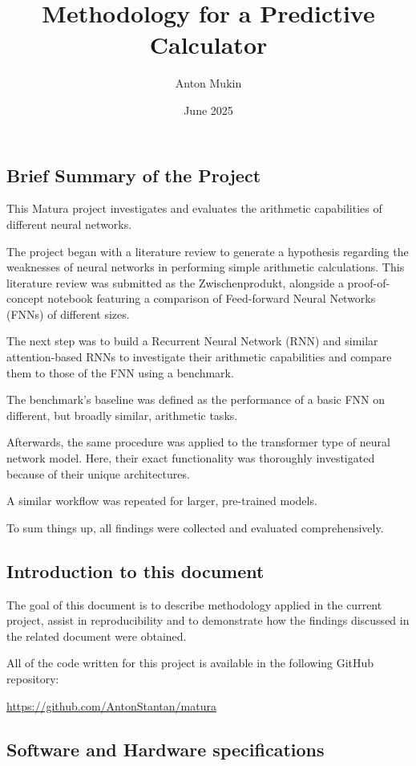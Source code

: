 \documentclass{article}
\title{Methodology for a Predictive Calculator}
\author{Anton Mukin}
\date{June 2025}
\begin{document}
\maketitle

\subsection{Brief Summary of the Project}
This Matura project investigates and evaluates the arithmetic capabilities of different neural networks.

The project began with a literature review to generate a hypothesis regarding the weaknesses of neural networks in performing simple arithmetic calculations. This literature review was submitted as the Zwischenprodukt, alongside a proof-of-concept notebook featuring a comparison of Feed-forward Neural Networks (FNNs) of different sizes.

The next step was to build a Recurrent Neural Network (RNN) and similar attention-based RNNs to investigate their arithmetic capabilities and compare them to those of the FNN using a benchmark.

The benchmark's baseline was defined as the performance of a basic FNN on different, but broadly similar, arithmetic tasks.

Afterwards, the same procedure was applied to the transformer type of neural network model. Here, their exact functionality was thoroughly investigated because of their unique architectures.

A similar workflow was repeated for larger, pre-trained models.

To sum things up, all findings were collected and evaluated comprehensively.


\subsection{Introduction to this document}
The goal of this document is to describe methodology applied in the current project, assist in reproducibility and to demonstrate how the findings discussed in the related document were obtained.

All of the code written for this project is available in the following GitHub repository:

\url{https://github.com/AntonStantan/matura}

\newpage

\subsection{Software and Hardware specifications}
\end{document}
